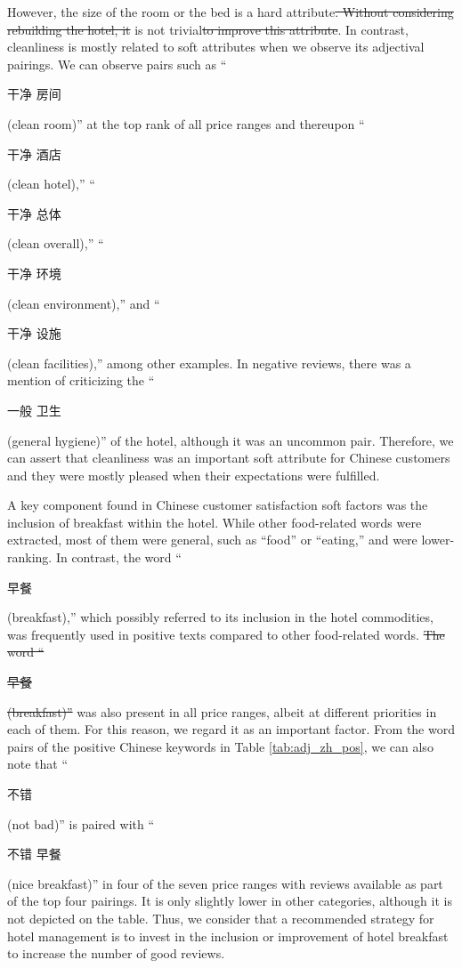 \documentclass[smallextended,natbib]{svjour3}       %
\providecommand{\DIFadd}[1]{{\protect\color{blue}\uwave{#1}}} %
\providecommand{\DIFdel}[1]{{\protect\color{red}\sout{#1}}}                      %
\providecommand{\DIFaddbegin}{} %
\providecommand{\DIFaddend}{} %
\providecommand{\DIFdelbegin}{} %
\providecommand{\DIFdelend}{} %
\newcommand{\DIFscaledelfig}{0.5}
\newlength{\DIFdelgraphicswidth} %
\newlength{\DIFdelgraphicsheight} %
\newcommand{\DIFaddincludegraphics}[2][]{{\color{blue}\fbox{\DIFOincludegraphics[#1]{#2}}}} %
\newcommand{\DIFdelincludegraphics}[2][]{%
\sbox{\DIFdelgraphicsbox}{\DIFOincludegraphics[#1]{#2}}%
\settoboxwidth{\DIFdelgraphicswidth}{\DIFdelgraphicsbox} %
\settoboxtotalheight{\DIFdelgraphicsheight}{\DIFdelgraphicsbox} %
\scalebox{\DIFscaledelfig}{%
\parbox[b]{\DIFdelgraphicswidth}{\usebox{\DIFdelgraphicsbox}\\[-\baselineskip] \rule{\DIFdelgraphicswidth}{0em}}\llap{\resizebox{\DIFdelgraphicswidth}{\DIFdelgraphicsheight}{%
\setlength{\unitlength}{\DIFdelgraphicswidth}%
\begin{picture}(1,1)%
\thicklines\linethickness{2pt} %
{\color[rgb]{1,0,0}\put(0,0){\framebox(1,1){}}}%
{\color[rgb]{1,0,0}\put(0,0){\line( 1,1){1}}}%
{\color[rgb]{1,0,0}\put(0,1){\line(1,-1){1}}}%
\end{picture}%
}\hspace*{3pt}}} %
} %
\DeclareRobustCommand{\DIFaddbegin}{\DIFOaddbegin \let\includegraphics\DIFaddincludegraphics} %
\DeclareRobustCommand{\DIFaddend}{\DIFOaddend \let\includegraphics\DIFOincludegraphics} %
\DeclareRobustCommand{\DIFdelbegin}{\DIFOdelbegin \let\includegraphics\DIFdelincludegraphics} %
\DeclareRobustCommand{\DIFdelend}{\DIFOaddend \let\includegraphics\DIFOincludegraphics} %
\begin{document}
    However, the size of the room or the bed is a hard attribute\DIFdelbegin \DIFdel{. Without considering rebuilding the hotel, it }\DIFdelend \DIFaddbegin \DIFadd{, of which a change }\DIFaddend is not trivial\DIFdelbegin \DIFdel{to improve this attribute}\DIFdelend . In contrast, cleanliness is mostly related to soft attributes when we observe its adjectival pairings. We can observe pairs such as ``\begin{CJK}{UTF8}{gbsn}干净 房间\end{CJK} (clean room)'' at the top rank of all price ranges and thereupon ``\begin{CJK}{UTF8}{gbsn}干净 酒店\end{CJK} (clean hotel),'' ``\begin{CJK}{UTF8}{gbsn}干净 总体\end{CJK} (clean overall),'' ``\begin{CJK}{UTF8}{gbsn}干净 环境\end{CJK} (clean environment),'' and ``\begin{CJK}{UTF8}{gbsn}干净 设施\end{CJK} (clean facilities),'' among other examples. In negative reviews, there was a mention of criticizing the ``\begin{CJK}{UTF8}{gbsn}一般 卫生\end{CJK} (general hygiene)'' of the hotel, although it was an uncommon pair. Therefore, we can assert that cleanliness was an important soft attribute for Chinese customers and they were mostly pleased when their expectations were fulfilled. 

    A key component found in Chinese customer satisfaction soft factors was the inclusion of breakfast within the hotel. While other food-related words were extracted, most of them were general, such as ``food'' or ``eating,'' and were lower-ranking. In contrast, the word ``\begin{CJK}{UTF8}{gbsn}早餐\end{CJK} (breakfast),'' which possibly referred to its inclusion in the hotel commodities, was frequently used in positive texts compared to other food-related words. \DIFdelbegin \DIFdel{The word ``}\begin{CJK}{UTF8}{gbsn}\DIFdel{早餐}\end{CJK} \DIFdel{(breakfast)'' }\DIFdelend \DIFaddbegin \DIFadd{This keyword }\DIFaddend was also present in all price ranges, albeit at different priorities in each of them. For this reason, we regard it as an important factor. From the word pairs of the positive Chinese keywords in Table \ref{tab:adj_zh_pos}, we can also note that ``\begin{CJK}{UTF8}{gbsn}不错\end{CJK} (not bad)'' is paired with ``\begin{CJK}{UTF8}{gbsn}不错 早餐\end{CJK} (nice breakfast)'' in four of the seven price ranges with reviews available as part of the top four pairings. It is only slightly lower in other categories, although it is not depicted on the table. Thus, we consider that a recommended strategy for hotel management is to invest in the inclusion or improvement of hotel breakfast to increase the number of good reviews.
\end{document}
